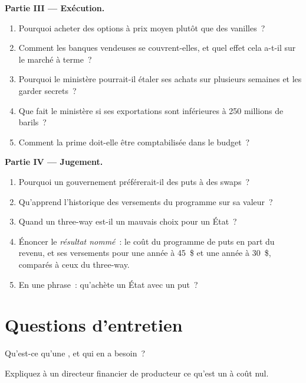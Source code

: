 \begin{problem}
\medskip\noindent\textbf{Partie III --- Exécution.}
\begin{enumerate}[resume]
\item Pourquoi acheter des options à prix moyen plutôt que des vanilles~?
\item Comment les banques vendeuses se couvrent-elles, et quel effet cela a-t-il sur le marché à terme~?
\item Pourquoi le ministère pourrait-il étaler ses achats sur plusieurs semaines et les garder secrets~?
\item Que fait le ministère si ses exportations sont inférieures à 250 millions de barils~?
\item Comment la prime doit-elle être comptabilisée dans le budget~?
\end{enumerate}

\medskip\noindent\textbf{Partie IV --- Jugement.}
\begin{enumerate}[resume]
\item Pourquoi un gouvernement préférerait-il des puts à des swaps~?
\item Qu'apprend l'historique des versements du programme sur sa valeur~?
\item Quand un three-way est-il un mauvais choix pour un État~?
\item Énoncer le \emph{résultat nommé}~: le coût du programme de puts en part du revenu, et ses versements pour
une année à 45~\$ et une année à 30~\$, comparés à ceux du three-way.
\item En une phrase~: qu'achète un État avec un put~?
\end{enumerate}
\end{problem}

\section{Questions d'entretien}

\begin{interviewq}\label{iq:m3:commodity-options-and-structured-hedges:1}
Qu'est-ce qu'une , et qui en a besoin~?
\end{interviewq}

\begin{interviewq}\label{iq:m3:commodity-options-and-structured-hedges:2}
Expliquez à un directeur financier de producteur ce qu'est un  à coût nul.
\end{interviewq}

